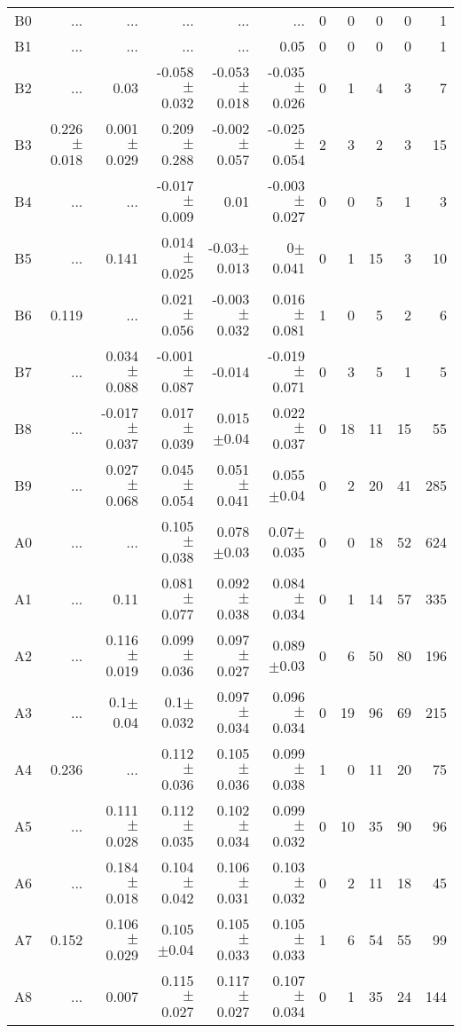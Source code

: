 \begin{table}[t]
\begin{table}[t]
\begin{center}
\begin{tabular}{c|rrrrr|rrrrr}
    B0	&	 ...	&	 ...	&	 ...	&	 ...	&	 ...	&	0	&	0	&	0	&	0	&	1	\\
    B1	&	 ...	&	 ...	&	 ...	&	 ...	&	0.05	&	0	&	0	&	0	&	0	&	1	\\
    B2	&	 ...	&	0.03	&	-0.058$\pm$0.032	&	-0.053$\pm$0.018	&	-0.035$\pm$0.026	&	0	&	1	&	4	&	3	&	7	\\
    B3	&	0.226$\pm$0.018	&	0.001$\pm$0.029	&	0.209$\pm$0.288	&	-0.002$\pm$0.057	&	-0.025$\pm$0.054	&	2	&	3	&	2	&	3	&	15	\\
    B4	&	 ...	&	 ...	&	-0.017$\pm$0.009	&	0.01	&	-0.003$\pm$0.027	&	0	&	0	&	5	&	1	&	3	\\
    B5	&	 ...	&	0.141	&	0.014$\pm$0.025	&	-0.03$\pm$0.013	&	0$\pm$0.041	&	0	&	1	&	15	&	3	&	10	\\
    B6	&	0.119	&	 ...	&	0.021$\pm$0.056	&	-0.003$\pm$0.032	&	0.016$\pm$0.081	&	1	&	0	&	5	&	2	&	6	\\
    B7	&	 ...	&	0.034$\pm$0.088	&	-0.001$\pm$0.087	&	-0.014	&	-0.019$\pm$0.071	&	0	&	3	&	5	&	1	&	5	\\
    B8	&	 ...	&	-0.017$\pm$0.037	&	0.017$\pm$0.039	&	0.015$\pm$0.04	&	0.022$\pm$0.037	&	0	&	18	&	11	&	15	&	55	\\
    B9	&	 ...	&	0.027$\pm$0.068	&	0.045$\pm$0.054	&	0.051$\pm$0.041	&	0.055$\pm$0.04	&	0	&	2	&	20	&	41	&	285	\\
    A0	&	 ...	&	 ...	&	0.105$\pm$0.038	&	0.078$\pm$0.03	&	0.07$\pm$0.035	&	0	&	0	&	18	&	52	&	624	\\
    A1	&	 ...	&	0.11	&	0.081$\pm$0.077	&	0.092$\pm$0.038	&	0.084$\pm$0.034	&	0	&	1	&	14	&	57	&	335	\\
    A2	&	 ...	&	0.116$\pm$0.019	&	0.099$\pm$0.036	&	0.097$\pm$0.027	&	0.089$\pm$0.03	&	0	&	6	&	50	&	80	&	196	\\
    A3	&	 ...	&	0.1$\pm$0.04	&	0.1$\pm$0.032	&	0.097$\pm$0.034	&	0.096$\pm$0.034	&	0	&	19	&	96	&	69	&	215	\\
    A4	&	0.236	&	 ...	&	0.112$\pm$0.036	&	0.105$\pm$0.036	&	0.099$\pm$0.038	&	1	&	0	&	11	&	20	&	75	\\
    A5	&	 ...	&	0.111$\pm$0.028	&	0.112$\pm$0.035	&	0.102$\pm$0.034	&	0.099$\pm$0.032	&	0	&	10	&	35	&	90	&	96	\\
    A6	&	 ...	&	0.184$\pm$0.018	&	0.104$\pm$0.042	&	0.106$\pm$0.031	&	0.103$\pm$0.032	&	0	&	2	&	11	&	18	&	45	\\
    A7	&	0.152	&	0.106$\pm$0.029	&	0.105$\pm$0.04	&	0.105$\pm$0.033	&	0.105$\pm$0.033	&	1	&	6	&	54	&	55	&	99	\\
    A8	&	 ...	&	0.007	&	0.115$\pm$0.027	&	0.117$\pm$0.027	&	0.107$\pm$0.034	&	0	&	1	&	35	&	24	&	144	\\

\end{tabular}
\end{center}
\end{table}
\end{table}
